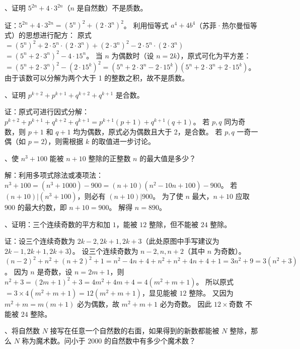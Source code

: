 \begin{questions}
、证明 $5^{2n} + 4 \cdot 3^{2n}$（$n$ 是自然数）不是质数。

\begin{solution}
证：$5^{2n} + 4 \cdot 3^{2n} = (5^n)^2 + (2 \cdot 3^n)^2$。
利用恒等式 $a^4 + 4b^4$（苏菲·热尔曼恒等式）的思想进行配方：
原式 $= (5^n)^2 + 2 \cdot 5^n \cdot (2 \cdot 3^n) + (2 \cdot 3^n)^2 - 2 \cdot 5^n \cdot (2 \cdot 3^n)$
$= (5^n + 2 \cdot 3^n)^2 - 4 \cdot 15^n$。
当 $n$ 为偶数时（设 $n=2k$），原式可化为平方差：
$= (5^n + 2 \cdot 3^n)^2 - (2 \cdot 15^k)^2 = (5^n + 2 \cdot 3^n - 2 \cdot 15^k)(5^n + 2 \cdot 3^n + 2 \cdot 15^k)$。
由于该数可以分解为两个大于 1 的整数之积，故不是质数。
\end{solution}

、证明 $p^{k+2} + p^{k+1} + q^{k+2} + q^{k+1}$ 是合数。

\begin{solution}
证：原式可进行因式分解：
$p^{k+2} + p^{k+1} + q^{k+2} + q^{k+1} = p^{k+1}(p + 1) + q^{k+1}(q + 1)$。
若 $p, q$ 同为奇数，则 $p+1$ 和 $q+1$ 均为偶数，原式必为偶数且大于 2，是合数。
若 $p, q$ 一奇一偶（如 $p=2$），则需根据 $k$ 的取值进一步讨论。
\end{solution}

、使 $n^3 + 100$ 能被 $n + 10$ 整除的正整数 $n$ 的最大值是多少？

\begin{solution}
解：利用多项式除法或凑项法：
$n^3 + 100 = (n^3 + 1000) - 900 = (n + 10)(n^2 - 10n + 100) - 900$。
若 $(n + 10) | (n^3 + 100)$，则必有 $(n + 10) | 900$。
为了使 $n$ 最大，$n + 10$ 应取 $900$ 的最大约数，即 $n + 10 = 900$。
解得 $n = 890$。
\end{solution}

、证明：三个连续奇数的平方和加 $1$，能被 $12$ 整除，但不能被 $24$ 整除。

\begin{solution}
证：设三个连续奇数为 $2k-2, 2k+1, 2k+3$（此处原图中手写建议为 $2k-1, 2k+1, 2k+3$）。
设三个连续奇数为 $n-2, n, n+2$（其中 $n$ 为奇数）。
$(n-2)^2 + n^2 + (n+2)^2 + 1 = n^2 - 4n + 4 + n^2 + n^2 + 4n + 4 + 1 = 3n^2 + 9 = 3(n^2 + 3)$。
因为 $n$ 是奇数，设 $n = 2m + 1$，则 $n^2 + 3 = (2m + 1)^2 + 3 = 4m^2 + 4m + 4 = 4(m^2 + m + 1)$。
所以原式 $= 3 \times 4(m^2 + m + 1) = 12(m^2 + m + 1)$，显见能被 $12$ 整除。
又因为 $m^2 + m = m(m+1)$ 必为偶数，故 $m^2 + m + 1$ 必为奇数。
因此 $12 \times \text{奇数}$ 不能被 $24$ 整除。
\end{solution}

、将自然数 $N$ 接写在任意一个自然数的右面，如果得到的新数都能被 $N$ 整除，那么 $N$ 称为魔术数。问小于 $2000$ 的自然数中有多少个魔术数？


\end{questions}
